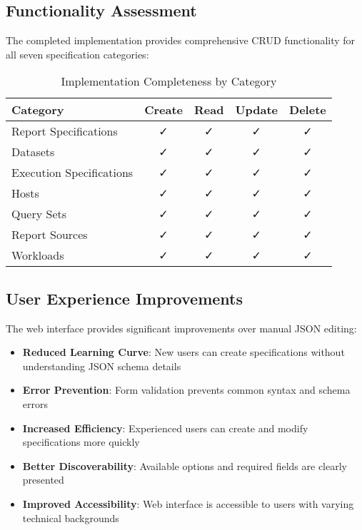 \documentclass[11pt,a4paper]{article}
\begin{document}
\subsection{Functionality Assessment}

The completed implementation provides comprehensive CRUD functionality for all seven specification categories:

\begin{table}[H]
\centering
\caption{Implementation Completeness by Category}
\begin{tabular}{@{}lcccc@{}}
\toprule
\textbf{Category} & \textbf{Create} & \textbf{Read} & \textbf{Update} & \textbf{Delete} \\
\midrule
Report Specifications & ✓ & ✓ & ✓ & ✓ \\
Datasets & ✓ & ✓ & ✓ & ✓ \\
Execution Specifications & ✓ & ✓ & ✓ & ✓ \\
Hosts & ✓ & ✓ & ✓ & ✓ \\
Query Sets & ✓ & ✓ & ✓ & ✓ \\
Report Sources & ✓ & ✓ & ✓ & ✓ \\
Workloads & ✓ & ✓ & ✓ & ✓ \\
\bottomrule
\end{tabular}
\end{table}

\subsection{User Experience Improvements}

The web interface provides significant improvements over manual JSON editing:

\begin{itemize}
    \item \textbf{Reduced Learning Curve}: New users can create specifications without understanding JSON schema details
    \item \textbf{Error Prevention}: Form validation prevents common syntax and schema errors
    \item \textbf{Increased Efficiency}: Experienced users can create and modify specifications more quickly
    \item \textbf{Better Discoverability}: Available options and required fields are clearly presented
    \item \textbf{Improved Accessibility}: Web interface is accessible to users with varying technical backgrounds
\end{itemize}
\end{document}
